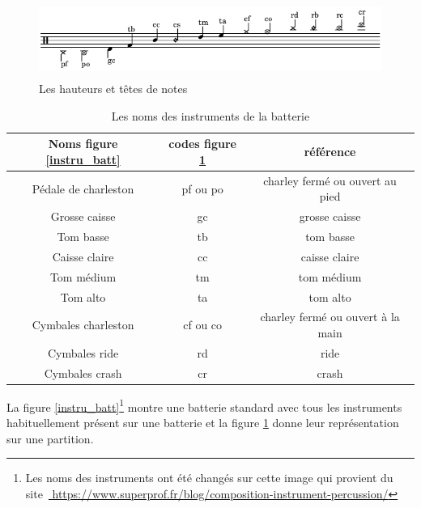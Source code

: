 \begin{figure}[!h]
\centering
\includegraphics[height=25mm, width=130mm]{
z_images/3_methodes/0_notation_de_la_batterie/2_hauteurs_et_tete_de_notes.png}
\caption{Les hauteurs et têtes de notes}
\label{haut}
\end{figure}

\begin{table}[h]
\centering
\begin{tabular}{|c|c|c|} \hline
Noms figure \ref{instru_batt} & codes figure \ref{haut}  & référence \\ \hline
Pédale de charleston & pf ou po & charley fermé ou ouvert au pied \\
Grosse caisse & gc & grosse caisse \\
Tom basse & tb & tom basse \\
Caisse claire & cc & caisse claire \\
Tom médium & tm & tom médium \\
Tom alto & ta & tom alto \\
Cymbales charleston & cf ou co & charley fermé ou ouvert à la main \\
Cymbales ride & rd & ride \\
Cymbales crash & cr & crash \\ \hline
	\end{tabular}
	\caption{Les noms des instruments de la batterie}
	\label{nom_instru_batt}
\end{table}\newpage
La figure \ref{instru_batt}\footnote{Les noms des instruments ont été changés
    sur cette image qui provient du site \url{
https://www.superprof.fr/blog/composition-instrument-percussion/}} montre une
batterie standard avec tous les instruments habituellement présent sur une
batterie et la figure \ref{haut} donne leur représentation sur une partition.\\

